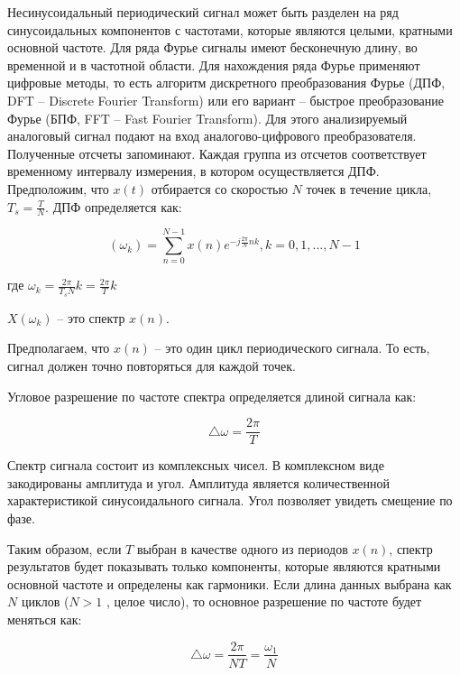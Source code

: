 Несинусоидальный периодический сигнал может быть разделен на ряд синусоидальных компонентов с частотами, которые являются целыми, кратными основной частоте. Для ряда Фурье сигналы имеют бесконечную длину, во временной и в частотной области.
Для нахождения ряда Фурье применяют цифровые методы, то есть алгоритм дискретного преобразования Фурье (ДПФ, DFT – Discrete Fourier Transform) или его вариант – быстрое преобразование Фурье (БПФ, FFT – Fast Fourier Transform). Для этого анализируемый аналоговый сигнал подают на вход аналогово-цифрового преобразователя. Полученные отсчеты запоминают. Каждая группа из  отсчетов соответствует временному интервалу измерения, в котором осуществляется ДПФ.
Предположим, что $x(t)$ отбирается со скоростью $N$  точек в течение цикла, $T_s =\frac{T}{N}$. ДПФ определяется как:

\begin{equation}
	\label{eq:equation1.3}
(\omega_{k}) =  \displaystyle\sum_{n=0}^{N-1} x(n) e^{-j \frac{2 \pi}{N}nk}, k = 0,1, ..., N-1
\end{equation}

где $\omega_{k} = \frac{2 \pi}{T_s N} k = \frac{2 \pi}{T} k$

$X (\omega_{k})$ -- это спектр $x(n)$.
 
Предполагаем, что $x(n)$  – это один цикл периодического сигнала. То есть, сигнал должен точно повторяться для каждой   точек.

Угловое разрешение по частоте спектра определяется длиной сигнала как:

\begin{equation}
	\label{eq:equation1.4}
\bigtriangleup \omega = \frac{2 \pi}{T}
\end{equation}

Спектр сигнала состоит из комплексных чисел. В комплексном виде закодированы амплитуда и угол. Амплитуда является количественной характеристикой синусоидального сигнала. Угол позволяет увидеть смещение по фазе.

Таким образом, если $T$ выбран в качестве одного из периодов $x(n)$, спектр результатов будет показывать только компоненты, которые являются кратными основной частоте и определены как гармоники. Если длина данных выбрана как  $N$ циклов ($N>1$ , целое число), то основное разрешение по частоте будет меняться как:

\begin{equation}
	\label{eq:equation1.5}
\bigtriangleup \omega = \frac{2 \pi}{NT} = \frac{\omega_1}{N}
\end{equation}

